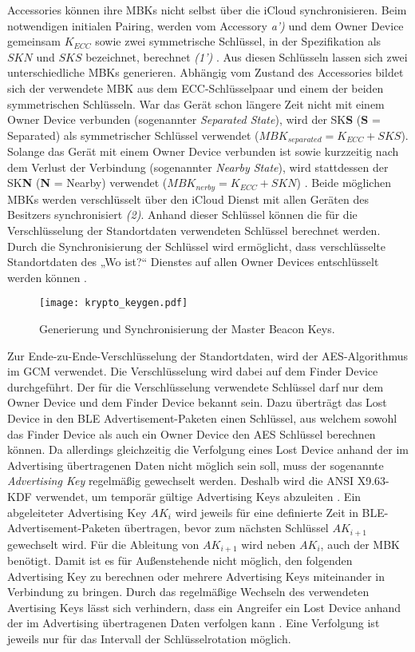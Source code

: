 Accessories können ihre \acp{MBK} nicht selbst über die iCloud synchronisieren.
Beim notwendigen initialen Pairing, werden vom Accessory \textit{a')} und dem Owner Device gemeinsam $K_{ECC}$ sowie zwei symmetrische Schlüssel, in der Spezifikation als $SKN$ und $SKS$ bezeichnet, berechnet \textit{(1')} \cite{Apple_FindMySpec}.
Aus diesen Schlüsseln lassen sich zwei unterschiedliche \acp{MBK} generieren.
Abhängig vom Zustand des Accessories bildet sich der verwendete \ac{MBK} aus dem \ac{ECC}-Schlüsselpaar und einem der beiden symmetrischen Schlüsseln.
War das Gerät schon längere Zeit nicht mit einem Owner Device verbunden (sogenannter \textit{Separated State}), wird der SK\textbf{S} (\textbf{S} = Separated) als symmetrischer Schlüssel verwendet ($MBK_{separated} = K_{ECC} + SKS$).
Solange das Gerät mit einem Owner Device verbunden ist sowie kurzzeitig nach dem Verlust der Verbindung (sogenannter \textit{Nearby State}), wird stattdessen der SK\textbf{N} (\textbf{N} = Nearby) verwendet ($MBK_{nerby} = K_{ECC} + SKN$) \cite{Apple_FindMySpec}.
Beide möglichen \acp{MBK} werden verschlüsselt über den iCloud Dienst mit allen Geräten des Besitzers synchronisiert \textit{(2)}.
Anhand dieser Schlüssel können die für die Verschlüsselung der Standortdaten verwendeten Schlüssel berechnet werden.
Durch die Synchronisierung der Schlüssel wird ermöglicht, dass verschlüsselte Standortdaten des „Wo ist?“ Dienstes auf allen Owner Devices entschlüsselt werden können \cite{Heinrich_FindMy}.
\begin{figure}[ht]
    \centering
    \texttt{[image: krypto\_keygen.pdf]}
    \caption{Generierung und Synchronisierung der Master Beacon Keys.}
    \label{fig:crypto_keygen}
\end{figure}


Zur Ende-zu-Ende-Verschlüsselung der Standortdaten, wird der \ac{AES}-Algorithmus im \ac{GCM} verwendet.
Die Verschlüsselung wird dabei  auf dem Finder Device durchgeführt.
Der für die Verschlüsselung verwendete Schlüssel darf nur dem Owner Device und dem Finder Device bekannt sein.
Dazu überträgt das Lost Device in den \ac{BLE} Advertisement-Paketen einen Schlüssel, aus welchem sowohl das Finder Device als auch ein Owner Device den \ac{AES} Schlüssel berechnen können.
Da allerdings gleichzeitig die Verfolgung eines Lost Device anhand der im Advertising übertragenen Daten nicht möglich sein soll, muss der sogenannte \textit{Advertising Key} regelmäßig gewechselt werden.
Deshalb wird die ANSI X9.63-\ac{KDF} verwendet, um temporär gültige Advertising Keys abzuleiten \cite{Apple_FindMySpec,Heinrich_FindMy}.
Ein abgeleiteter Advertising Key $AK_i$ wird jeweils für eine definierte Zeit in \ac{BLE}-Advertisement-Paketen übertragen, bevor zum nächsten Schlüssel $AK_{i+1}$ gewechselt wird.
Für die Ableitung von $AK_{i+1}$ wird neben $AK_{i}$, auch der \ac{MBK} benötigt.
Damit ist es für Außenstehende nicht möglich, den folgenden Advertising Key zu berechnen oder mehrere Advertising Keys miteinander in Verbindung zu bringen.
Durch das regelmäßige Wechseln des verwendeten Avertising Keys lässt sich verhindern, dass ein Angreifer ein Lost Device anhand der im Advertising übertragenen Daten verfolgen kann \cite{Heinrich_FindMy}.
Eine Verfolgung ist jeweils nur für das Intervall der Schlüsselrotation möglich.

